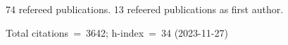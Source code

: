 74 refereed publications. 13 refeered publications as first author.

Total citations~=~3642; h-index~=~34 (2023-11-27)